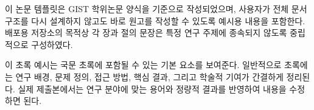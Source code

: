 이 논문 템플릿은 GIST 학위논문 양식을 기준으로 작성되었으며, 사용자가 전체 문서 구조를 다시 설계하지 않고도 바로 원고를 작성할 수 있도록 예시용 내용을 포함한다. 배포용 저장소의 목적상 각 장과 절의 문장은 특정 연구 주제에 종속되지 않도록 중립적으로 구성하였다.

이 초록 예시는 국문 초록에 포함될 수 있는 기본 요소를 보여준다. 일반적으로 초록에는 연구 배경, 문제 정의, 접근 방법, 핵심 결과, 그리고 학술적 기여가 간결하게 정리된다. 실제 제출본에서는 연구 분야에 맞는 용어와 정량적 결과를 반영하여 내용을 수정하면 된다.

